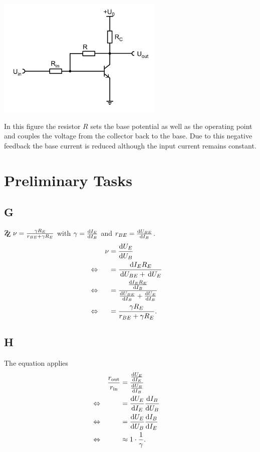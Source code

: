 \documentclass[a4paper,10pt]{article}
\newcommand{\td}{\,\text{d}}
\newcommand{\zz}{\mathrm{Z\kern-.3em\raise-0.5ex\hbox{Z} }}
\newenvironment{Figure}
  {\par\medskip\noindent\minipage{\linewidth}}
  {\endminipage\par\medskip} %
\numberwithin{equation}{section}
\begin{document}
\begin{multicols}{2}
	\begin{Figure}
		\centering
		\includegraphics[width=0.6\textwidth]{spannungsgegenkopplung.png}
	\end{Figure}
	In this figure the resistor $R$ sets the base potential as well as the operating point and couples the voltage from the collector back to the base.
	Due to this negative feedback the base current is reduced although the input current remains constant.

	\newpage
	\section{Preliminary Tasks}
	\subsection{G}
	$\zz\ \nu =\tfrac{\gamma R_E}{r_{BE}+\gamma R_E}$ with $\gamma =\diff[]{I_E}{I_B}$ and $r_{BE}=\diff[]{U_{BE}}{I_B}$.
	\begin{align}
		                &  & \nu & = \diff[]{U_E}{U_B}                                                    &  &           \\
		\Leftrightarrow &  &     & = \dfrac{\td I_ER_E}{\td U_{BE}+\td U_E}                               &  & \nonumber \\
		\Leftrightarrow &  &     & = \dfrac{\diff[]{I_ER_E}{I_B}}{\diff[]{U_{BE}}{I_B}+\diff[]{U_E}{I_B}} &  & \nonumber \\
		\Leftrightarrow &  &     & = \dfrac{\gamma R_E}{r_{BE}+\gamma R_E}.                               &  &
	\end{align}

	\subsection{H}
	The equation applies
	\begin{align}
		                &  & \dfrac{r_\text{out}}{r_\text{in}} & = \dfrac{\diff[]{U_E}{I_E}}{\diff[]{U_B}{I_B}} &  &           \\
		\Leftrightarrow &  &                                   & = \diff[]{U_E}{I_E}\diff[]{I_B}{U_B}           &  & \nonumber \\
		\Leftrightarrow &  &                                   & = \diff[]{U_E}{U_B}\diff[]{I_B}{I_E}           &  & \nonumber \\
		\Leftrightarrow &  &                                   & \approx 1\cdot \dfrac{1}{\gamma }.             &  &
	\end{align}


\end{multicols}
\end{document}
